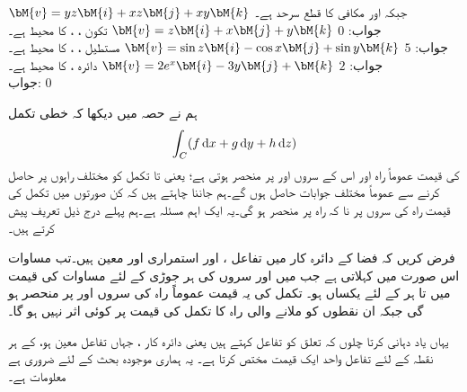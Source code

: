\quad
$\bM{v}=yz\bM{i}+xz\bM{j}+xy\bM{k}$
جبکہ   اور  مکافی  کا قطع سرحد  ہے۔\\
جواب:\quad 
$0$
\quad
$\bM{v}=z\bM{i}+x\bM{j}+y\bM{k}$
تکون  ، ،  کا محیط  ہے۔\\
جواب:\quad 
$5$
\quad
$\bM{v}=\sin z\bM{i}-\cos x\bM{j}+\sin y\bM{k}$
مستطیل  ، ،  کا محیط  ہے۔\\
جواب:\quad 
$2$
\quad
$\bM{v}=2e^x\bM{i}-3y\bM{j}+\bM{k}$
دائرہ  ،  کا محیط  ہے۔\\
جواب:\quad 
$0$

ہم نے حصہ  میں دیکھا کہ خطی تکمل
\begin{align}\label{مساوات_خطی_تکمل_آزاد_راہ_الف}
\int_C (f\dif x+g\dif y+h\dif z)
\end{align}
کی قیمت عموماً راہ  اور اس کے سروں  اور  پر منحصر ہوتی ہے؛ یعنی  تا  تکمل کو مختلف راہوں پر حاصل کرنے سے عموماً مختلف جوابات حاصل ہوں گے۔ہم جاننا چاہتے ہیں کہ کن صورتوں میں تکمل کی قیمت راہ کی سروں پر نا کہ راہ پر منحصر ہو گی۔یہ ایک اہم مسئلہ ہے۔ہم پہلے درج ذیل تعریف پیش کرتے ہیں۔

فرض کریں کہ فضا کے دائرہ کار  میں تفاعل ،  اور  استمراری اور معین ہیں۔تب مساوات  اس صورت  میں   کہلاتی ہے جب  میں  اور  سروں کی ہر جوڑی کے لئے مساوات  کی قیمت  میں  تا  ہر  کے لئے یکساں ہو۔ تکمل کی یہ قیمت عموماً راہ کی سروں  اور  پر منحصر ہو گی جبکہ ان نقطوں کو ملانے والی راہ کا تکمل کی قیمت پر کوئی اثر نہیں ہو گا۔ 

یہاں یاد دہانی کرتا چلوں کہ    تعلق کو تفاعل کہتے ہیں یعنی دائرہ کار ،  جہاں تفاعل معین ہو، کے  ہر نقطہ کے لئے تفاعل واحد ایک  قیمت مختص  کرتا ہے۔ یہ ہماری موجودہ بحث کے لئے ضروری ہے معلومات ہے۔

